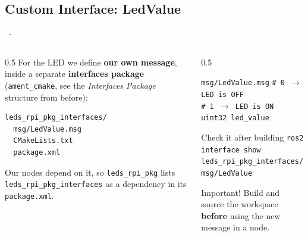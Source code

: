 \documentclass{beamer}
\begin{document}
\subsection{Custom Interface: LedValue}
\begin{frame}[fragile]{\insertsection \ - \insertsubsection}
    \begin{columns}[c]
        \begin{column}{0.5\textwidth}
            For the LED we define \textbf{our own message}, inside a separate \textbf{interfaces package} (\texttt{ament\_cmake}, see the \emph{Interfaces Package} structure from before):
            \begin{lstlisting}
leds_rpi_pkg_interfaces/
  msg/LedValue.msg
  CMakeLists.txt
  package.xml
            \end{lstlisting}
            Our nodes depend on it, so \texttt{leds\_rpi\_pkg} lists \texttt{leds\_rpi\_pkg\_interfaces} as a dependency in its \texttt{package.xml}.
        \end{column}
        \begin{column}{0.5\textwidth}
            \begin{block}{\texttt{msg/LedValue.msg}}
                \small
                \texttt{\# 0 $\rightarrow$ LED is OFF} \\
                \texttt{\# 1 $\rightarrow$ LED is ON} \\
                \texttt{uint32 led\_value}
            \end{block}
            \begin{block}{Check it after building}
                \scriptsize \texttt{ros2 interface show \\ leds\_rpi\_pkg\_interfaces/msg/LedValue}
            \end{block}
            \begin{block}{Important!}
                \small
                Build and source the workspace \textbf{before} using the new message in a node.
            \end{block}
        \end{column}
    \end{columns}
\end{frame}
\end{document}

